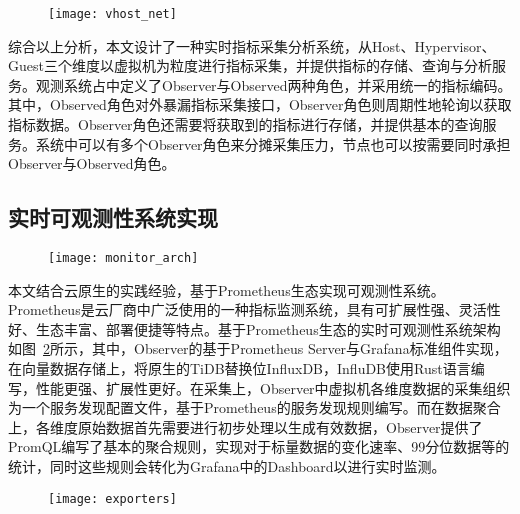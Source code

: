 \begin{figure}[!htbp]
    \centering
    \texttt{[image: vhost\_net]}
    \label{fig:vhost_net}
\end{figure}

综合以上分析，本文设计了一种实时指标采集分析系统，从Host、Hypervisor、Guest三个维度以虚拟机为粒度进行指标采集，并提供指标的存储、查询与分析服务。观测系统占中定义了Observer与Observed两种角色，并采用统一的指标编码。其中，Observed角色对外暴漏指标采集接口，Observer角色则周期性地轮询以获取指标数据。Observer角色还需要将获取到的指标进行存储，并提供基本的查询服务。系统中可以有多个Observer角色来分摊采集压力，节点也可以按需要同时承担Observer与Observed角色。

\subsection{实时可观测性系统实现}


\begin{figure}[!htbp]
    \centering
    \texttt{[image: monitor\_arch]}
    \label{fig:monitor_arch}
\end{figure}

本文结合云原生的实践经验，基于Prometheus\citep{prometheus}生态实现可观测性系统。Prometheus是云厂商中广泛使用的一种指标监测系统，具有可扩展性强、灵活性好、生态丰富、部署便捷等特点。基于Prometheus生态的实时可观测性系统架构如图~\ref{fig:monitor_arch}所示，其中，Observer的基于Prometheus Server与Grafana标准组件实现，在向量数据存储上，将原生的TiDB替换位InfluxDB，InfluDB使用Rust语言编写，性能更强、扩展性更好。在采集上，Observer中虚拟机各维度数据的采集组织为一个服务发现配置文件，基于Prometheus的服务发现规则编写。而在数据聚合上，各维度原始数据首先需要进行初步处理以生成有效数据，Observer提供了PromQL编写了基本的聚合规则，实现对于标量数据的变化速率、99分位数据等的统计，同时这些规则会转化为Grafana中的Dashboard以进行实时监测。

\begin{figure}[!htbp]
    \centering
    \texttt{[image: exporters]}
    \label{fig:exporters} 
\end{figure}

